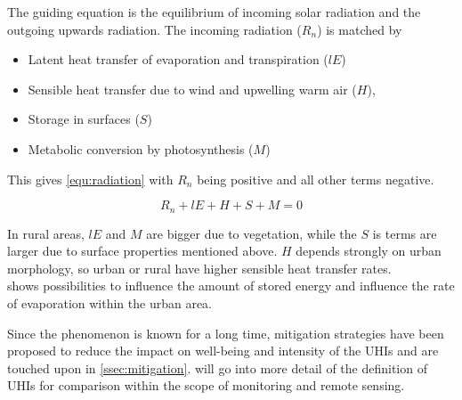 \documentclass[12pt,a4paper, english,twoside]{scrartcl}
\begin{document}
    The guiding equation is the equilibrium of incoming solar radiation and the outgoing upwards radiation. 
    The incoming radiation ($R_n$) is matched by
  \begin{itemize}
    \item Latent heat transfer of evaporation and transpiration ($lE$)
    \item Sensible heat transfer due to wind and upwelling warm air ($H$), 
    \item Storage in surfaces ($S$)
    \item Metabolic conversion by photosynthesis ($M$)
  \end{itemize}
    This gives \cref{equ:radiation} with $R_n$ being positive and all other terms negative.

    \begin{equation}\label{equ:radiation}
      R_n + lE + H + S + M = 0
    \end{equation}
    
    In rural areas, $lE$ and $M$ are bigger due to vegetation, while the $S$ is terms are larger due to surface properties mentioned above.
    $H$ depends strongly on urban morphology, so urban or rural have higher sensible heat transfer rates.\\
     shows possibilities to influence the amount of stored energy and influence the rate of evaporation within the urban area.

    
    Since the phenomenon is known for a long time, mitigation strategies have been proposed to reduce the impact on well-being and intensity of the \glspl{UHI} and are touched upon in \cref{ssec:mitigation}.
     will go into more detail of the definition of \glspl{UHI} for comparison within the scope of monitoring and remote sensing. 
\end{document}
